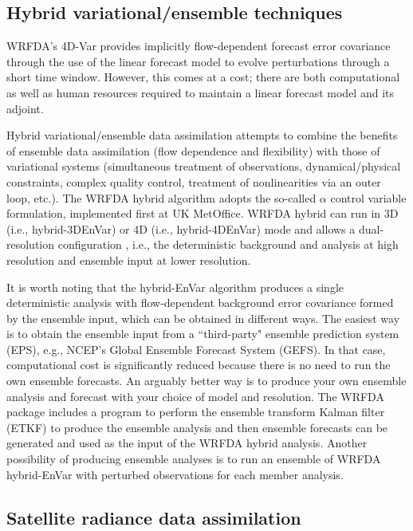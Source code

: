 \subsection{Hybrid variational/ensemble techniques}

WRFDA's 4D-Var provides implicitly flow-dependent forecast error covariance
through the use of the linear forecast model to evolve perturbations through a short time window. 
However, this comes at a cost; there are both computational as well as human resources
required to maintain a linear forecast model and its adjoint. 

Hybrid variational/ensemble data assimilation attempts to combine the benefits of ensemble data assimilation 
(flow dependence and flexibility) with those of variational systems (simultaneous treatment of observations,
dynamical/physical constraints, complex quality control, treatment of nonlinearities via an outer
loop, etc.). The WRFDA hybrid algorithm \citep{wang08a, wang08b} adopts the so-called $\alpha$ control variable formulation, 
implemented first at UK MetOffice. WRFDA hybrid can run in 3D (i.e., hybrid-3DEnVar) or 
4D (i.e., hybrid-4DEnVar) mode and allows a dual-resolution configuration \citep{schwartz15}, i.e., the deterministic
background and analysis at high resolution and ensemble input at lower resolution. 

It is worth noting that the hybrid-EnVar algorithm produces a single deterministic analysis with flow-dependent background
error covariance formed by the ensemble input, which can be obtained in different ways.
The easiest way is to obtain the ensemble input from a ``third-party" ensemble prediction system (EPS), e.g.,
NCEP's Global Ensemble Forecast System (GEFS). In that case, computational cost is significantly reduced
because there is no need to run the own ensemble forecasts.
An arguably better way is to produce your own ensemble analysis and forecast with your choice of model and resolution.
The WRFDA package includes a program to perform the ensemble transform Kalman filter (ETKF) to produce the ensemble
analysis and then ensemble forecasts can be generated and used as the input of the WRFDA hybrid analysis.
Another possibility of producing ensemble analyses is to run an ensemble of WRFDA hybrid-EnVar with perturbed observations for each member analysis.

\subsection{Satellite radiance data assimilation}

